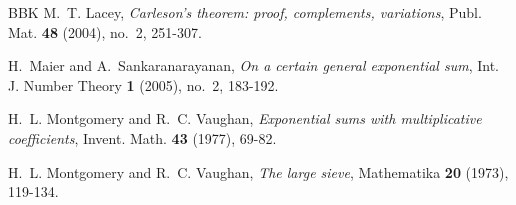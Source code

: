 \documentclass[11pt]{amsart}
\numberwithin{equation}{section}
\numberwithin{figure}{section}
\theoremstyle{definition}
\begin{document}
\begin{thebibliography}{BBK}
M.~T. Lacey,
\emph{Carleson's theorem: proof, complements, variations},
Publ. Mat. \textbf{48} (2004), no.~2, 251-307.

H.~Maier and A.~Sankaranarayanan,
\emph{On a certain general exponential sum},
Int. J. Number Theory \textbf{1} (2005), no.~2, 183-192.

H.~L. Montgomery and R.~C. Vaughan,
\emph{Exponential sums with multiplicative coefficients},
Invent. Math. \textbf{43} (1977), 69-82.

H.~L. Montgomery and R.~C. Vaughan,
\emph{The large sieve},
Mathematika \textbf{20} (1973), 119-134.

\end{thebibliography}
\end{document}

